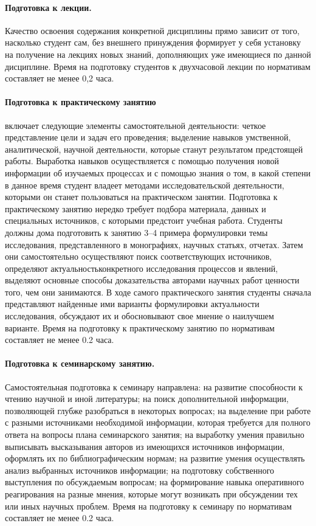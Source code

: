 {\paragraph{Подготовка к лекции.} Качество освоения содержания конкретной дисциплины
прямо зависит от того, насколько студент сам, без внешнего принуждения формирует у
себя установку на получение на лекциях новых знаний, дополняющих уже имеющиеся по
данной дисциплине. Время на подготовку студентов к двухчасовой лекции по нормативам
составляет не менее 0,2 часа.\par
\paragraph{Подготовка к практическому занятию}
включает следующие элементы самостоятельной деятельности: четкое представление
цели и задач его проведения; выделение навыков умственной, аналитической, научной
деятельности, которые станут результатом предстоящей работы. Выработка навыков
осуществляется с помощью получения новой информации об изучаемых процессах и с
помощью знания о том, в какой степени в данное время студент владеет методами
исследовательской деятельности, которыми он станет пользоваться на практическом
занятии. Подготовка к практическому занятию нередко требует подбора материала,
данных и специальных источников, с которыми предстоит учебная работа. Студенты
должны дома подготовить к занятию 3--4 примера формулировки темы исследования,
представленного в монографиях, научных статьях, отчетах. Затем они самостоятельно
осуществляют поиск соответствующих источников, определяют актуальностьконкретного исследования процессов и явлений, выделяют основные способы доказательства авторами научных работ ценности того, чем они занимаются. В ходе
самого практического занятия студенты сначала представляют найденные ими варианты
формулировки актуальности исследования, обсуждают их и обосновывают свое мнение о
наилучшем варианте. Время на подготовку к практическому занятию по нормативам
составляет не менее 0.2 часа.\par
\paragraph{Подготовка к семинарскому занятию.} Самостоятельная подготовка к семинару
направлена: на развитие способности к чтению научной и иной литературы; на поиск
дополнительной информации, позволяющей глубже разобраться в некоторых вопросах; на
выделение при работе с разными источниками необходимой информации, которая
требуется для полного ответа на вопросы плана семинарского занятия; на выработку
умения правильно выписывать высказывания авторов из имеющихся источников
информации, оформлять их по библиографическим нормам; на развитие умения
осуществлять анализ выбранных источников информации; на подготовку собственного
выступления по обсуждаемым вопросам; на формирование навыка оперативного
реагирования на разные мнения, которые могут возникать при обсуждении тех или иных
научных проблем. Время на подготовку к семинару по нормативам составляет не менее
0.2 часа.\par
}

